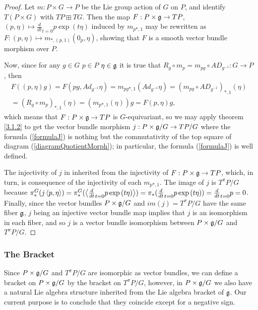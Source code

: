 \begin{proof}
Let $m: P \times G \to P$ be the Lie group action of $G$ on $P$, and identify $T(P \times G)$ with $TP \boxplus TG$. Then the map $F: P \times \mathfrak{g} \to TP$, $(p, \eta) \mapsto \frac{d}{dt}_{t = 0}p \exp{(t \eta)}$ induced by $m_{p*, 1}$ may be rewritten as $F: (p, \eta) \mapsto m_{*, (p, 1)}(0_p, \eta)$, showing that $F$ is a smooth vector bundle morphism over $P$.

Now, since for any $g \in G$ $p \in P$ $\eta \in \mathfrak{g}$ it is true that $R_g \circ m_p = m_{pg} \circ AD_{g^{-1}} : G \to P$, then 
\begin{multline*}
F((p, \eta)g)
= F(pg, Ad_{g^{-1}}\eta)
= m_{pg*, 1}(Ad_{g^{-1}}\eta)
= (m_{pg} \circ AD_{g^{-1}})_{*, 1}(\eta)\\
= (R_g \circ m_{p})_{*, 1}(\eta) 
= (m_{p*, 1}(\eta))g = F(p, \eta) g,
\end{multline*}
which means that $F: P \times \mathfrak{g} \to TP$ is $G$-equivariant, so we may apply theorem \ref{3.1.2} to get the vector bundle morphism $j: P \times \mathfrak{g}/G \to TP/G$ where the formula (\ref{formulaJ}) is nothing but the commutativity of the top square of diagram (\ref{diagramQuotientMorph}); in particular, the formula (\ref{formulaJ}) is well defined.

The injectivity of $j$ in inherited from the injectivity of $F: P \times \mathfrak{g} \to TP$, which, in turn, is consequence of the injectivity of each $m_{p*, 1}$. The image of $j$ is $T^\pi P/G$ because $\pi_*^G(j\left\langle p, \eta \right\rangle) = \pi_*^G(\left\langle \frac{d}{dt}_{t = 0}p \exp{(t \eta)} \right\rangle) = \pi_*(\frac{d}{dt}_{t = 0}p \exp{(t \eta)}) = \frac{d}{dt}_{t= 0} p = 0$. Finally, since the vector bundles $P \times \mathfrak{g}/G$ and $im(j) = T^\pi P/G$ have the same fiber $\mathfrak{g}$, $j$ being an injective vector bundle map implies that $j$ is an isomorphism in each fiber, and so $j$ is a vector bundle isomorphism between $P \times \mathfrak{g}/G$ and $T^\pi P/G$.
\end{proof}

\subsubsection{The Bracket}

Since $P \times \mathfrak{g}/G$ and $T^\pi P/G$ are isomorphic as vector bundles, we can define a bracket on $P \times \mathfrak{g}/G$ by the bracket on $T^\pi P/G$, however, in $P \times \mathfrak{g}/G$ we also have a natural Lie algebra structure inherited from the Lie algebra bracket of $\mathfrak{g}$. Our current purpose is to conclude that they coincide except for a negative sign.

